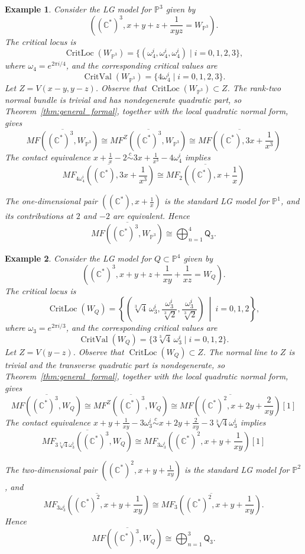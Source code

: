 \documentclass[11pt]{amsart}
\newtheorem{example}{Example}[section]
\DeclareMathOperator{\CritVal}{CritVal}
\DeclareMathOperator{\CritLoc}{CritLoc}
\newcommand{\MorseCat}[1]{\mathsf{Q}_{#1}}
\begin{document}
\begin{example}
    Consider the LG model for $\mathbb{P}^3$ given by
    \[
    \left((\mathbb{C}^*)^3,x+y+z+\frac{1}{xyz}=W_{\mathbb{P}^3}\right).
    \]
    The critical locus is
    \[
    \CritLoc(W_{\mathbb{P}^3})=\{(\omega_4^i,\omega_4^i,\omega_4^i)\mid i=0,1,2,3\},
    \]
    where $\omega_4=e^{2\pi i/4}$, and the corresponding critical values are
    \[
    \CritVal(W_{\mathbb{P}^3})=\{4\omega_4^i\mid i=0,1,2,3\}.
    \]
    Let $Z=V(x-y,y-z)$. Observe that $\CritLoc(W_{\mathbb{P}^3})\subset Z$. The rank-two normal bundle is trivial and has nondegenerate quadratic part, so Theorem~\ref{thm:general_formal}, together with the local quadratic normal form, gives
    \[
    \overline{MF((\mathbb{C}^*)^3,W_{\mathbb{P}^3})}\cong \overline{MF^Z((\mathbb{C}^*)^3,W_{\mathbb{P}^3})}\cong\overline{MF\left((\mathbb{C}^*),3x+\frac{1}{x^3}\right)}
    \]
    The contact equivalence $x+\frac{1}{x}-2\overset{c}{\sim} 3x+\frac{1}{x^3}-4\omega_{4}^i$ implies
    \[
    \overline{MF_{4\omega_4^i}\left((\mathbb{C}^*),3x+\frac{1}{x^3}\right)}\cong \overline{MF_2\left((\mathbb{C}^*),x+\frac{1}{x}\right)}
    \]

The one-dimensional pair
$\left((\mathbb{C}^*),x+\frac{1}{x}\right)$ is the standard LG model for
$\mathbb{P}^1$, and its contributions at $2$ and $-2$ are equivalent. Hence
\[
\overline{MF((\mathbb{C}^*)^3,W_{\mathbb{P}^3})}
\cong \bigoplus_{n=1}^{4}\MorseCat{3}.
\]

\end{example}
\begin{example}
    Consider the LG model for $Q\subset\mathbb{P}^4$ given by
    \[
    \left((\mathbb{C}^*)^3,x+y+z+\frac{1}{xy}+\frac{1}{xz}=W_{Q}\right).
    \]
    The critical locus is
    \[
    \CritLoc(W_Q)=\left\{\left(\sqrt[3]{4}\,\omega_3^i,\frac{\omega_3^i}{\sqrt[3]{2}},\frac{\omega_3^i}{\sqrt[3]{2}}\right)\ \middle|\ i=0,1,2\right\},
    \]
    where $\omega_3=e^{2\pi i/3}$, and the corresponding critical values are
    \[
    \CritVal(W_Q)=\{3\sqrt[3]{4}\,\omega_3^i\mid i=0,1,2\}.
    \]
    Let $Z=V(y-z)$. Observe that $\CritLoc(W_Q)\subset Z$. The normal line to $Z$ is trivial and the transverse quadratic part is nondegenerate, so Theorem~\ref{thm:general_formal}, together with the local quadratic normal form, gives
    \[
    \overline{MF((\mathbb{C}^*)^3,W_{Q})}\cong \overline{MF^Z((\mathbb{C}^*)^3,W_{Q})}\cong\overline{MF\left((\mathbb{C}^*)^2,x+2y+\frac{2}{xy}\right)}[1]
    \]
    The contact equivalence $x+y+\frac{1}{xy}-3\omega_3^i\overset{c}{\sim}x+2y+\frac{2}{xy}-3\sqrt[3]{4}\omega_3^i$ implies
    \[
    \overline{MF_{3\sqrt[3]{4}\omega_3^i}\left((\mathbb{C}^*)^3,W_{Q}\right)}\cong \overline{MF_{3\omega_3^i}\left((\mathbb{C}^*)^2,x+y+\frac{1}{xy}\right)}[1]
    \]

The two-dimensional pair
$\left((\mathbb{C}^*)^2,x+y+\frac{1}{xy}\right)$ is the standard LG model
for $\mathbb{P}^2$, and
\[
\overline{MF_{3\omega_3^{i}}\left((\mathbb{C}^*)^2,x+y+\frac{1}{xy}\right)}
\cong
\overline{MF_{3}\left((\mathbb{C}^*)^2,x+y+\frac{1}{xy}\right)}.
\]
Hence
\[
\overline{MF((\mathbb{C}^*)^3,W_{Q})}
\cong \bigoplus_{n=1}^{3}\MorseCat{3}.
\]

\end{example}
\end{document}
